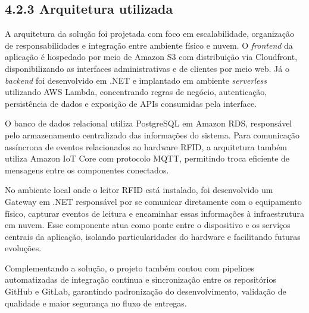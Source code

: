 \hypertarget{__RefHeading___Toc4807_3118176633}{}
\subsection*{4.2.3 Arquitetura utilizada}
\label{ages-iii:text-h-0079}

\originaltab{}A arquitetura da solução foi projetada com foco em escalabilidade, organização de responsabilidades e integração entre ambiente físico e nuvem. O \textit{frontend} da aplicação é hospedado por meio de Amazon S3\space\cite{ages-iii-s3} com distribuição via Cloudfront\space\cite{ages-iii-cloudfront}, disponibilizando as interfaces administrativas e de clientes por meio web. Já o \textit{backend} foi desenvolvido em .NET\space\cite{ages-iii-dotnet} e implantado em ambiente \textit{serverless} utilizando AWS Lambda\space\cite{ages-iii-aws-lambda}, concentrando regras de negócio, autenticação, persistência de dados e exposição de APIs consumidas pela interface.\par

O banco de dados relacional utiliza PostgreSQL\space\cite{ages-iii-postgresql} em Amazon RDS\space\cite{ages-iii-rds}, responsável pelo armazenamento centralizado das informações do sistema. Para comunicação assíncrona de eventos relacionados ao hardware RFID\space\cite{ages-iii-rfid-nist}, a arquitetura também utiliza Amazon IoT Core\space\cite{ages-iii-aws-iot-core} com protocolo MQTT\space\cite{ages-iii-mqtt}, permitindo troca eficiente de mensagens entre os componentes conectados.\par

No ambiente local onde o leitor RFID está instalado, foi desenvolvido um Gateway em .NET responsável por se comunicar diretamente com o equipamento físico, capturar eventos de leitura e encaminhar essas informações à infraestrutura em nuvem. Esse componente atua como ponte entre o dispositivo e os serviços centrais da aplicação, isolando particularidades do hardware e facilitando futuras evoluções.\par

Complementando a solução, o projeto também contou com pipelines automatizadas de integração contínua e sincronização entre os repositórios GitHub\space\cite{ages-iii-github-actions} e GitLab\space\cite{ages-iii-gitlab}, garantindo padronização do desenvolvimento, validação de qualidade e maior segurança no fluxo de entregas.\par

